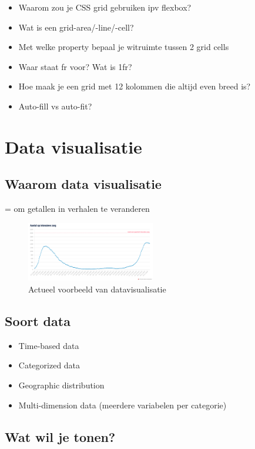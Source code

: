 \documentclass{article}
\begin{document}
\begin{itemize}
    \item Waarom zou je CSS grid gebruiken ipv flexbox?
    \item Wat is een grid-area/-line/-cell?
    \item Met welke property bepaal je witruimte tussen 2 grid cells
    \item Waar staat fr voor? Wat is 1fr?
    \item Hoe maak je een grid met 12 kolommen die altijd even breed is?
    \item Auto-fill vs auto-fit?
\end{itemize}

\section{Data visualisatie}

\subsection{Waarom data visualisatie}

= om getallen in verhalen te veranderen

\begin{figure}[H]
    \centering
    \includegraphics[width=0.5\textwidth]{dv-corona.png}
    \caption{Actueel voorbeeld van datavisualisatie}
\end{figure}


\subsection{Soort data}

\begin{itemize}
    \item Time-based data
    \item Categorized data
    \item Geographic distribution
    \item Multi-dimension data (meerdere variabelen per categorie)
\end{itemize}

\subsection{Wat wil je tonen?}
\end{document}
